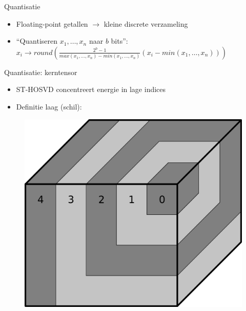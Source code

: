 \documentclass[t,12pt,dutch
\ifx\beamermode\undefined\else,\beamermode\fi
]{beamer}
\begin{document}
\begin{frame}{Quantisatie}
\begin{itemize}
\item Floating-point getallen $\rightarrow$ kleine discrete verzameling
\item ``Quantiseren $x_1, \dots, x_n$ naar $b$ bits'':\\
$x_i \rightarrow round(\frac{2^b - 1}{max(x_1, \dots, x_n) - min(x_1, \dots, x_n)} (x_i - min(x_1, \dots, x_n)))$
\end{itemize}
\end{frame}

\begin{frame}{Quantisatie: kerntensor}

\begin{itemize}
\item ST-HOSVD concentreert energie in lage indices
\item Definitie laag (schil):
\end{itemize}

\begin{figure}[H]
\centering
\includegraphics[scale=0.6]{images/core_tensor_layers.png}
\end{figure}

\end{frame}
\end{document}
